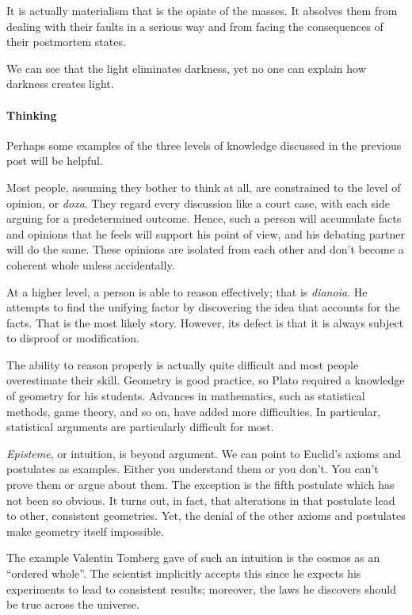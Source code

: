 It is actually materialism that is the opiate of the masses. It absolves them from dealing with their faults in a serious way and from facing the consequences of their postmortem states.

We can see that the light eliminates darkness, yet no one can explain how darkness creates light.

\paragraph{Thinking}
Perhaps some examples of the three levels of knowledge discussed in the previous post will be helpful.

Most people, assuming they bother to think at all, are constrained to the level of opinion, or \emph{doxa}. They regard every discussion like a court case, with each side arguing for a predetermined outcome. Hence, such a person will accumulate facts and opinions that he feels will support his point of view, and his debating partner will do the same. These opinions are isolated from each other and don't become a coherent whole unless accidentally.

At a higher level, a person is able to reason effectively; that is \emph{dianoia}. He attempts to find the unifying factor by discovering the idea that accounts for the facts. That is the most likely story. However, its defect is that it is always subject to disproof or modification.

The ability to reason properly is actually quite difficult and most people overestimate their skill. Geometry is good practice, so Plato required a knowledge of geometry for his students. Advances in mathematics, such as statistical methods, game theory, and so on, have added more difficulties. In particular, statistical arguments are particularly difficult for most.

\emph{Episteme}, or intuition, is beyond argument. We can point to Euclid's axioms and postulates as examples. Either you understand them or you don't. You can't prove them or argue about them. The exception is the fifth postulate which has not been so obvious. It turns out, in fact, that alterations in that postulate lead to other, consistent geometries. Yet, the denial of the other axioms and postulates make geometry itself impossible.

The example Valentin Tomberg gave of such an intuition is the cosmos as an “ordered whole”. The scientist implicitly accepts this since he expects his experiments to lead to consistent results; moreover, the laws he discovers should be true across the universe.

